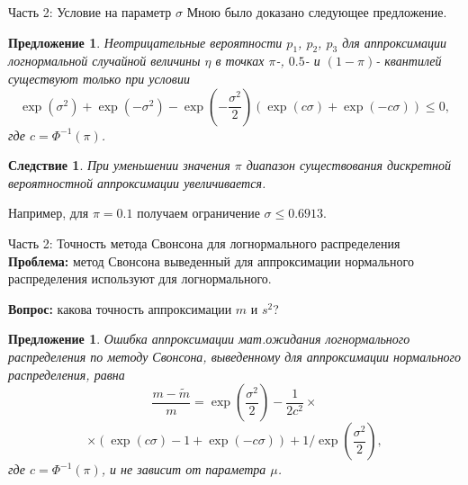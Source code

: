 \documentclass[ucs, notheorems, handout]{beamer}
\newtheorem{corollary}[theorem]{Следствие}
\newtheorem{proposition2}[theorem]{Предложение}
\begin{document}
	\begin{frame}{Часть 2: Условие на параметр $\sigma$}
		Мною было доказано следующее предложение.
		\begin{proposition2}
			Неотрицательные вероятности $p_{1}$, $p_{2}$, $p_{3}$ для аппроксимации логнормальной случайной величины $\eta$ в точках $\pi$-, $0.5$- и $(1-\pi)$- квантилей существуют только при условии \[\exp(\sigma^{2})+\exp(-\sigma^{2})-\exp\left( -\dfrac{\sigma^{2}}{2}\right) 
			(\exp(c\sigma)+\exp(-c\sigma))\leq 0,\] 
			где $c = \Phi^{-1}(\pi)$.
		\end{proposition2}
		
		\begin{corollary}
			При уменьшении значения $\pi$ диапазон существования дискретной вероятностной аппроксимации увеличивается.
		\end{corollary}
	
	Например, для $\pi = 0.1$ получаем ограничение $\sigma \leq 0.6913$.
	
		
	\end{frame}
	
	\begin{frame}{Часть 2: Точность метода Свонсона для логнормального распределения}
		\textbf{Проблема:} метод Свонсона выведенный для аппроксимации нормального распределения используют для логнормального.
		
		\textbf{Вопрос:} какова точность аппроксимации $m$ и $s^{2}$?
		
		\begin{proposition2}\label{pr5}
			Ошибка аппроксимации мат.ожидания логнормального распределения по методу Свонсона, выведенному для аппроксимации нормального распределения, равна
			\[\dfrac{ m - \widetilde{m} }{m} =  \exp\left( \dfrac{\sigma^{2}}{2}\right)  - \dfrac{1}{2 c^{2}}\times\]\[\times(\exp(c\sigma)-1 +\exp(-c\sigma)) + 1 /\exp\left(\dfrac{\sigma^{2}}{2}\right),\]
			где $c = \Phi^{-1}(\pi)$, и не зависит от параметра $\mu$.
		\end{proposition2}
	
	\end{frame}
	
\end{document}
